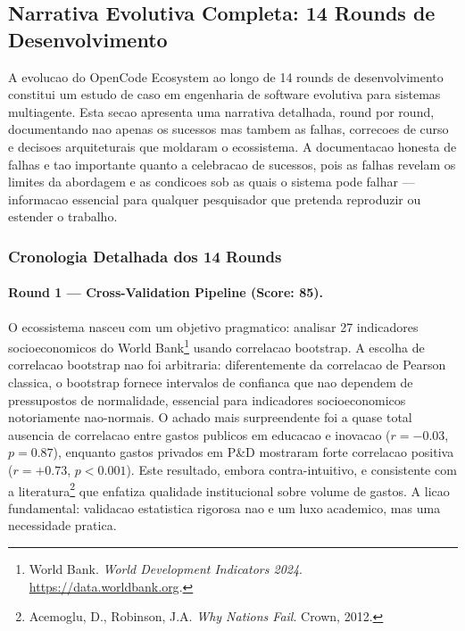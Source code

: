 
\subsection{Narrativa Evolutiva Completa: 14 Rounds de Desenvolvimento}

A evolucao do OpenCode Ecosystem ao longo de 14 rounds de desenvolvimento
constitui um estudo de caso em engenharia de software evolutiva para
sistemas multiagente. Esta secao apresenta uma narrativa detalhada, round
por round, documentando nao apenas os sucessos mas tambem as falhas,
correcoes de curso e decisoes arquiteturais que moldaram o ecossistema.
A documentacao honesta de falhas e tao importante quanto a celebracao
de sucessos, pois as falhas revelam os limites da abordagem e as condicoes
sob as quais o sistema pode falhar --- informacao essencial para qualquer
pesquisador que pretenda reproduzir ou estender o trabalho.

\subsubsection{Cronologia Detalhada dos 14 Rounds}

\paragraph{Round 1 --- Cross-Validation Pipeline (Score: 85).}

O ecossistema nasceu com um objetivo pragmatico: analisar 27 indicadores
socioeconomicos do World Bank\footnote{World Bank. \textit{World Development
Indicators 2024}. \url{https://data.worldbank.org}.} usando correlacao
bootstrap. A escolha de correlacao bootstrap nao foi arbitraria:
diferentemente da correlacao de Pearson classica, o bootstrap fornece
intervalos de confianca que nao dependem de pressupostos de normalidade,
essencial para indicadores socioeconomicos notoriamente nao-normais.
O achado mais surpreendente foi a quase total ausencia de correlacao entre
gastos publicos em educacao e inovacao ($r = -0.03$, $p = 0.87$), enquanto
gastos privados em P\&D mostraram forte correlacao positiva ($r = +0.73$,
$p < 0.001$). Este resultado, embora contra-intuitivo, e consistente com
a literatura\footnote{Acemoglu, D., Robinson, J.A. \textit{Why Nations
Fail}. Crown, 2012.} que enfatiza qualidade institucional sobre volume
de gastos. A licao fundamental: validacao estatistica rigorosa nao e um
luxo academico, mas uma necessidade pratica.

